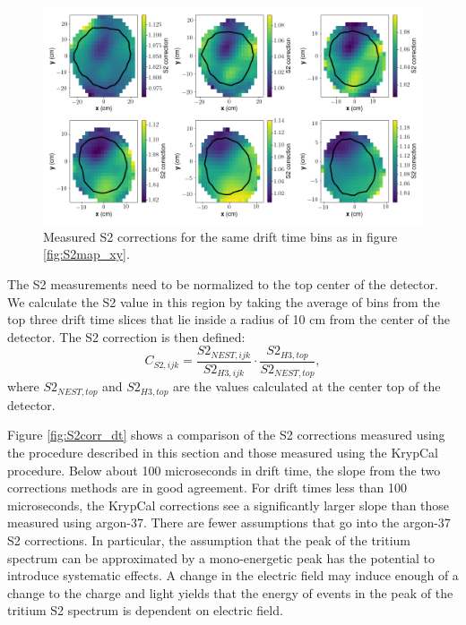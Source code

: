 \begin{figure}[h!]
\centering
\includegraphics[width=150mm]{Figures/S2corr_xy.png}
\caption{Measured S2 corrections for the same drift time bins as in figure \ref{fig:S2map_xy}. }
\label{fig:S2corr_xy} 
\end{figure}
The S2 measurements need to be normalized to the top center of the detector. We calculate the S2 value in this region by taking the average of bins from the top three drift time slices that lie inside a radius of 10 cm from the center of the detector. The S2 correction is then defined:
\begin{equation}
C_{S2,ijk}=\frac{S2_{NEST,ijk}}{S2_{H3,ijk}}\cdot \frac{S2_{H3,top}}{S2_{NEST,top}},
\end{equation}
where $S2_{NEST,top}$ and $S2_{H3,top}$ are the values calculated at the center top of the detector.

Figure \ref{fig:S2corr_dt} shows a comparison of the S2 corrections measured using the procedure described in this section and those measured using the KrypCal procedure. Below about 100 microseconds in drift time, the slope from the two corrections methods are in good agreement. For drift times less than 100 microseconds, the KrypCal corrections see a significantly larger slope than those measured using argon-37. There are fewer assumptions that go into the argon-37 S2 corrections. In particular, the assumption that the peak of the tritium spectrum can be approximated by a mono-energetic peak has the potential to introduce systematic effects. A change in the electric field may induce enough of a change to the charge and light yields that the energy of events in the peak of the tritium S2 spectrum is dependent on electric field. 

